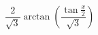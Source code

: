 \begin{displaymath}
 \dfrac{2}{\sqrt{3}}\arctan \left( \dfrac{\tan \frac{x}{2}}{\sqrt{3}}\right) 
\end{displaymath}
